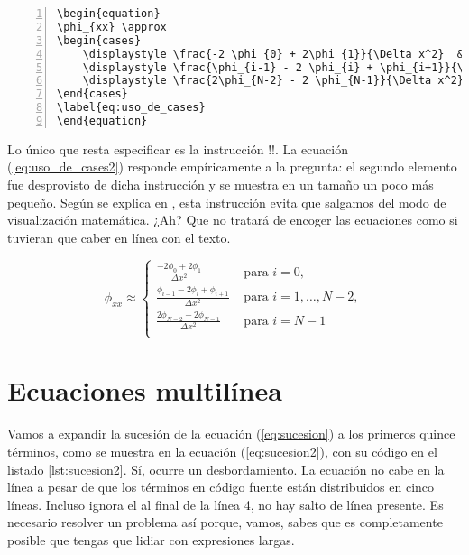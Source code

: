 \begin{lstlisting}[style=latex,numbers=left,caption={Uso del entorno \texttt{cases}.},label=lst:math_cases]
\begin{equation}
\phi_{xx} \approx
\begin{cases}
	\displaystyle \frac{-2 \phi_{0} + 2\phi_{1}}{\Delta x^2}  &  \mbox{ para } i = 0, \\
	\displaystyle \frac{\phi_{i-1} - 2 \phi_{i} + \phi_{i+1}}{\Delta x^2}  &  \mbox{ para } i = 1, \ldots, N - 2, \\
	\displaystyle \frac{2\phi_{N-2} - 2 \phi_{N-1}}{\Delta x^2}  &  \mbox{ para } i = N - 1 \\
\end{cases}
\label{eq:uso_de_cases}
\end{equation}
\end{lstlisting}

Lo único que resta especificar es la instrucción !\displaystyle!. La ecuación (\ref{eq:uso_de_cases2}) responde empíricamente a la pregunta: el segundo elemento fue desprovisto de dicha instrucción y se muestra en un tamaño un poco más pequeño. Según se explica en \cite{bib:math_displaystyle}, esta instrucción evita que salgamos del modo de visualización matemática. ¿Ah? Que no tratará de encoger las ecuaciones como si tuvieran que caber en línea con el texto.

\begin{equation}
\phi_{xx} \approx
\begin{cases}
	\displaystyle \frac{-2 \phi_{0} + 2\phi_{1}}{\Delta x^2}  &  \mbox{ para } i = 0, \\
	\frac{\phi_{i-1} - 2 \phi_{i} + \phi_{i+1}}{\Delta x^2}  &  \mbox{ para } i = 1, \ldots, N - 2, \\
	\displaystyle \frac{2\phi_{N-2} - 2 \phi_{N-1}}{\Delta x^2}  &  \mbox{ para } i = N - 1 \\
\end{cases}
\label{eq:uso_de_cases2}
\end{equation}



\section{Ecuaciones multilínea}
\label{sec:ecuaciones_multilinea}



Vamos a expandir la sucesión de la ecuación (\ref{eq:sucesion}) a los primeros quince términos, como se muestra en la ecuación (\ref{eq:sucesion2}), con su código en el listado \ref{lst:sucesion2}. Sí, ocurre un desbordamiento. La ecuación no cabe en la línea a pesar de que los términos en código fuente están distribuidos en cinco líneas. Incluso ignora el \codigo{\textbackslash{}} al final de la línea 4, no hay salto de línea presente. Es necesario resolver un problema así porque, vamos, sabes que es completamente posible que tengas que lidiar con expresiones largas.

